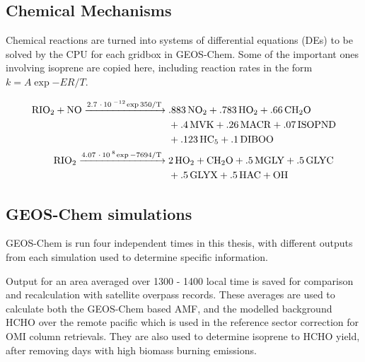   \subsection{Chemical Mechanisms}
    \label{Model:GC:Mechanisms}
    Chemical reactions are turned into systems of differential equations (DEs) to be solved by the CPU for each gridbox in GEOS-Chem.
    Some of the important ones involving isoprene are copied here, including reaction rates in the form $ k = A \exp{-ER/T} $.
  
  \begin{align} \begin{split}
    \label{Model:GC:Mechanisms:eqn_mechanisms}
    \ce{
      RIO2 + NO ->[2.7*10^{-12} \exp{350/T}] & .883NO2 + .783HO2 + .66CH2O \\
      & + .4MVK + .26MACR + .07ISOPND \\
      & + .123HC5 + .1DIBOO \\
      RIO2 ->[4.07*10^{8} \exp{-7694/T}] & 2HO2 + CH2O + .5MGLY + .5GLYC \\
      & + .5GLYX + .5HAC + OH
    }
  \end{split} \end{align}
  
  \subsection{GEOS-Chem simulations}
    \label{Model:GC:runs}
    
    GEOS-Chem is run four independent times in this thesis, with different outputs from each simulation used to determine specific information. 
    
    Output for an area averaged over 1300 - 1400 local time is saved for comparison and recalculation with satellite overpass records.
    These averages are used to calculate both the GEOS-Chem based AMF, and the modelled background HCHO over the remote pacific which is used in the reference sector correction for OMI column retrievals.
    They are also used to determine isoprene to HCHO yield, after removing days with high biomass burning emissions.

